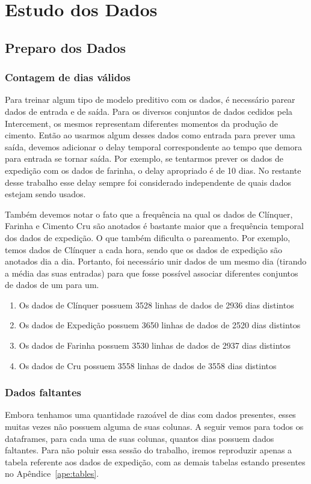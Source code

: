 \chapter{Estudo dos Dados}
\label{cap:estudodados}


\section{Preparo dos Dados}

\subsection{Contagem de dias válidos}

Para treinar algum tipo de modelo preditivo com os dados, é necessário parear dados de entrada e de saída. Para os diversos conjuntos de dados cedidos pela Intercement, os mesmos representam diferentes momentos da produção de cimento. Então ao usarmos algum desses dados como entrada para prever uma saída, devemos adicionar o delay temporal correspondente ao tempo que demora para entrada se tornar saída. Por exemplo, se tentarmos prever os dados de expedição com os dados de farinha, o delay apropriado é de 10 dias. No restante desse trabalho esse delay sempre foi considerado independente de quais dados estejam sendo usados.

Também devemos notar o fato que a frequência na qual os dados de Clínquer, Farinha e Cimento Cru são anotados é bastante maior que a frequência temporal dos dados de expedição. O que também dificulta o pareamento. Por exemplo, temos dados de Clínquer a cada hora, sendo que os dados de expedição são anotados dia a dia. Portanto, foi necessário unir dados de um mesmo dia (tirando a média das suas entradas) para que fosse possível associar diferentes conjuntos de dados de um para um.
\begin{enumerate}
    \item Os dados de  Clínquer possuem 3528 linhas de dados de 2936 dias distintos
\item Os dados de  Expedição possuem 3650 linhas de dados de 2520 dias distintos
\item Os dados de  Farinha possuem 3530 linhas de dados de 2937 dias distintos
\item Os dados de  Cru possuem 3558 linhas de dados de 3558 dias distintos
\end{enumerate}

\subsection{Dados faltantes}
Embora tenhamos uma quantidade razoável de dias com dados presentes, esses muitas vezes não possuem alguma de suas colunas.
A seguir vemos para todos os dataframes, para cada uma de suas colunas, quantos
dias possuem dados faltantes. Para não poluir essa sessão do trabalho, iremos
reproduzir apenas a tabela referente aos dados de expedição, com as demais
tabelas estando presentes no Apêndice~\ref{ape:tables}. \\

